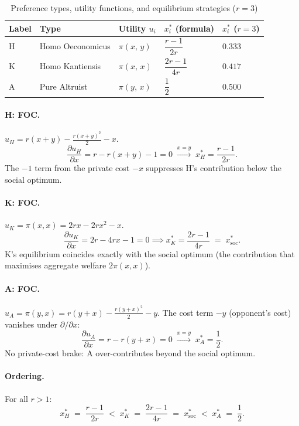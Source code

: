 \documentclass[11pt]{article}
\begin{document}
\begin{table}[H]
    \centering
    \caption{Preference types, utility functions, and equilibrium strategies ($r=3$)}
    \label{tab:types}
    \begin{tabular}{lllll}
        \toprule
        Label & Type & Utility $u_i$ & $x_i^*$ (formula) & $x_i^*$ ($r=3$) \\
        \midrule
        H & Homo Oeconomicus & $\pi(x,\,y)$   & $\dfrac{r-1}{2r}$   & $0.333$ \\[8pt]
        K & Homo Kantiensis  & $\pi(x,\,x)$   & $\dfrac{2r-1}{4r}$  & $0.417$ \\[8pt]
        A & Pure Altruist    & $\pi(y,\,x)$   & $\dfrac{1}{2}$      & $0.500$ \\
        \bottomrule
    \end{tabular}
\end{table}

\paragraph{H: FOC.}
$u_H = r(x+y) - \tfrac{r(x+y)^2}{2} - x$.
\[
    \frac{\partial u_H}{\partial x} = r - r(x+y) - 1 = 0
    \;\xrightarrow{x=y}\;
    x_H^* = \frac{r-1}{2r}.
\]
The $-1$ term from the private cost $-x$ suppresses H's contribution below the social optimum.

\paragraph{K: FOC.}
$u_K = \pi(x,x) = 2rx - 2rx^2 - x$.
\[
    \frac{\partial u_K}{\partial x} = 2r - 4rx - 1 = 0
    \implies
    x_K^* = \frac{2r-1}{4r} \;=\; x_{\mathrm{soc}}^*.
\]
K's equilibrium coincides exactly with the social optimum (the contribution that maximises aggregate welfare $2\pi(x,x)$).

\paragraph{A: FOC.}
$u_A = \pi(y,x) = r(y+x) - \tfrac{r(y+x)^2}{2} - y$. The cost term $-y$ (opponent's cost) vanishes under $\partial/\partial x$:
\[
    \frac{\partial u_A}{\partial x} = r - r(y+x) = 0
    \;\xrightarrow{x=y}\;
    x_A^* = \frac{1}{2}.
\]
No private-cost brake: A over-contributes beyond the social optimum.

\paragraph{Ordering.} For all $r > 1$:
\[
    x_H^* \;=\; \frac{r-1}{2r} \;<\; x_K^* \;=\; \frac{2r-1}{4r} \;=\; x_{\mathrm{soc}}^* \;<\; x_A^* \;=\; \frac{1}{2}.
\]
\end{document}
